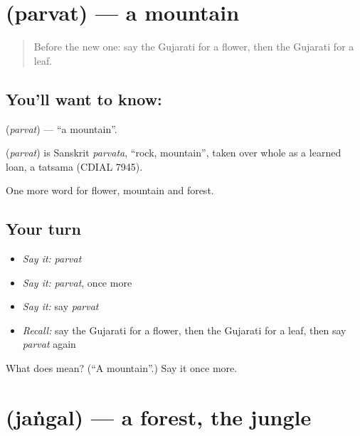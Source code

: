 \section[\texorpdfstring{\gu{પર્વત} (parvat)}{પર્વત (parvat)}]{ (parvat) — a mountain}

\label{lesson:GU-C64-mountain}



\begin{quote}
Before the new one: say the Gujarati for a flower, then the Gujarati for a leaf.
\end{quote}

\subsection*{You'll want to know: }
\textbf{} (\emph{parvat}) — \textquotedblleft{}a mountain\textquotedblright{}.

\begin{cousinweb}
\textbf{} (\emph{parvat}) is Sanskrit \emph{parvata}, \textquotedblleft{}rock, mountain\textquotedblright{}, taken over whole as a learned loan, a tatsama (CDIAL 7945).
\end{cousinweb}

\begin{grammarlens}[title={What you've built}]
One more word for flower, mountain and forest.
\end{grammarlens}

\subsection*{Your turn}
\begin{itemize}
\raggedright
  \item \emph{Say it:} \emph{parvat}
  \item \emph{Say it:} \emph{parvat}, once more
  \item \emph{Say it:} say \emph{parvat}
  \item \emph{Recall:} say the Gujarati for a flower, then the Gujarati for a leaf, then say \emph{parvat} again
\end{itemize}

\begin{tcolorbox}[breakable,colback=teal!4,colframe=teal!35!black,title={Before you move on}]
What does  mean? (\textquotedblleft{}A mountain\textquotedblright{}.) Say it once more.
\end{tcolorbox}
\section[\texorpdfstring{\gu{જંગલ} (jaṅgal)}{જંગલ (jaṅgal)}]{ (jaṅgal) — a forest, the jungle}

